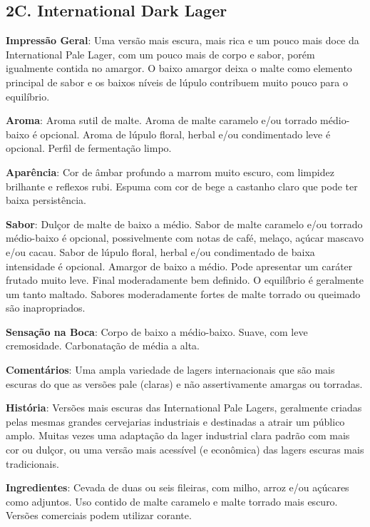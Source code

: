 \subsection*{2C. International Dark Lager}
\textbf{Impressão Geral}: Uma versão mais escura, mais rica e um pouco mais doce da International Pale Lager, com um pouco mais de corpo e sabor, porém igualmente contida no amargor. O baixo amargor deixa o malte como elemento principal de sabor e os baixos níveis de lúpulo contribuem muito pouco para o equilíbrio.

\textbf{Aroma}: Aroma sutil de malte. Aroma de malte caramelo e/ou torrado médio-baixo é opcional. Aroma de lúpulo floral, herbal e/ou condimentado leve é opcional. Perfil de fermentação limpo.

\textbf{Aparência}: Cor de âmbar profundo a marrom muito escuro, com limpidez brilhante e reflexos rubi. Espuma com cor de bege a castanho claro que pode ter baixa persistência.

\textbf{Sabor}: Dulçor de malte de baixo a médio. Sabor de malte caramelo e/ou torrado médio-baixo é opcional, possivelmente com notas de café, melaço, açúcar mascavo e/ou cacau. Sabor de lúpulo floral, herbal e/ou condimentado de baixa intensidade é opcional. Amargor de baixo a médio. Pode apresentar um caráter frutado muito leve. Final moderadamente bem definido. O equilíbrio é geralmente um tanto maltado. Sabores moderadamente fortes de malte torrado ou queimado são inapropriados.

\textbf{Sensação na Boca}: Corpo de baixo a médio-baixo. Suave, com leve cremosidade. Carbonatação de média a alta.

\textbf{Comentários}: Uma ampla variedade de lagers internacionais que são mais escuras do que as versões pale (claras) e não assertivamente amargas ou torradas.

\textbf{História}: Versões mais escuras das International Pale Lagers, geralmente criadas pelas mesmas grandes cervejarias industriais e destinadas a atrair um público amplo. Muitas vezes uma adaptação da lager industrial clara padrão com mais cor ou dulçor, ou uma versão mais acessível (e econômica) das lagers escuras mais tradicionais.

\textbf{Ingredientes}: Cevada de duas ou seis fileiras, com milho, arroz e/ou açúcares como adjuntos. Uso contido de malte caramelo e malte torrado mais escuro. Versões comerciais podem utilizar corante.

